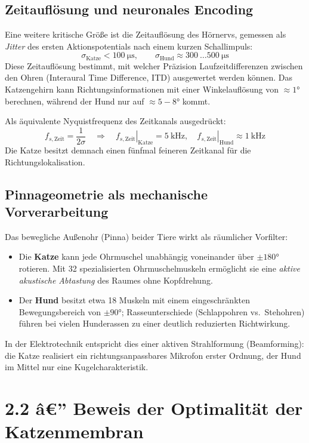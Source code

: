 ﻿\documentclass[12pt,a4paper,titlepage]{report}
\begin{document}
\subsection{Zeitauflösung und neuronales Encoding}

Eine weitere kritische Größe ist die Zeitauflösung des Hörnervs,
gemessen als \emph{Jitter} des ersten Aktionspotentials nach einem
kurzen Schallimpuls:
\[
\sigma_{\text{Katze}} < \SI{100}{\micro\second},
\qquad
\sigma_{\text{Hund}} \approx \SI{300}{\ldots}\SI{500}{\micro\second}
\]
Diese Zeitauflösung bestimmt, mit welcher Präzision Laufzeitdifferenzen
zwischen den Ohren (Interaural Time Difference, ITD) ausgewertet werden können.
Das Katzengehirn kann Richtungsinformationen mit einer Winkelauflösung von
$\approx 1 °$ berechnen, während der Hund nur auf $\approx 5{-}8 °$ kommt.

Als äquivalente Nyquistfrequenz des Zeitkanals ausgedrückt:
\[
f_{s,\text{Zeit}} = \frac{1}{2\sigma}
\quad\Rightarrow\quad
\left.f_{s,\text{Zeit}}\right|_{\text{Katze}} = \SI{5}{\kilo\hertz},
\quad
\left.f_{s,\text{Zeit}}\right|_{\text{Hund}} \approx \SI{1}{\kilo\hertz}
\]
Die Katze besitzt demnach einen fünfmal feineren Zeitkanal für die Richtungslokalisation.

\subsection{Pinnageometrie als mechanische Vorverarbeitung}

Das bewegliche Außenohr (Pinna) beider Tiere wirkt als räumlicher Vorfilter:
\begin{itemize}[leftmargin=2em]
\item Die \textbf{Katze} kann jede Ohrmuschel unabhängig voneinander über
$\pm 180 °$ rotieren. Mit 32 spezialisierten Ohrmuschelmuskeln ermöglicht
sie eine \emph{aktive akustische Abtastung} des Raumes ohne Kopfdrehung.
\item Der \textbf{Hund} besitzt etwa 18 Muskeln mit einem eingeschränkten
Bewegungsbereich von $\pm 90 °$; Rasseunterschiede (Schlappohren vs.~Stehohren)
führen bei vielen Hunderassen zu einer deutlich reduzierten Richtwirkung.
\end{itemize}
In der Elektrotechnik entspricht dies einer aktiven Strahlformung (Beamforming):
die Katze realisiert ein richtungsanpassbares Mikrofon erster Ordnung,
der Hund im Mittel nur eine Kugelcharakteristik.

\section{2.2 â€” Beweis der Optimalität der Katzenmembran}
\label{sec:aktiv}
\end{document}
